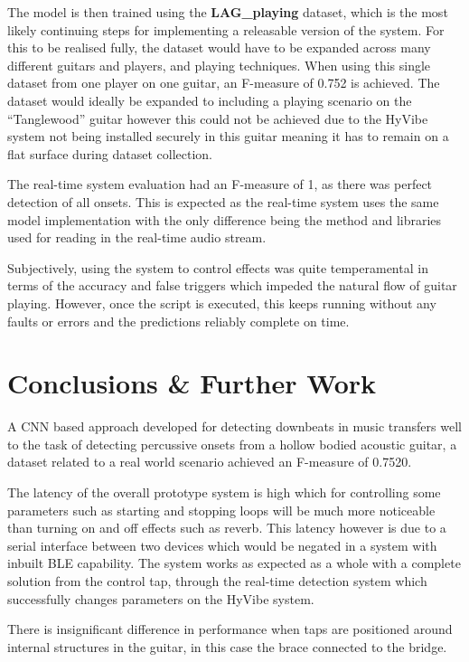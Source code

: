 \documentclass[conference]{IEEEtran}
\begin{document}
The model is then trained using the \textbf{LAG\_playing} dataset, which is the most likely continuing steps for implementing a releasable version of the system. For this to be realised fully, the dataset would have to be expanded across many different guitars and players, and playing techniques. When using this single dataset
from one player on one guitar, an F-measure of 0.752 is achieved. The dataset would ideally be expanded to including a playing scenario on the ``Tanglewood'' guitar however this could not be achieved due to the HyVibe system not being installed securely in this guitar meaning it has to remain on a flat
surface during dataset collection.

The real-time system evaluation had an F-measure of 1, as there was perfect detection of all onsets. This is expected as the real-time system uses the same model implementation with the only difference being the method and libraries used
for reading in the real-time audio stream. 

Subjectively, using the system to control effects was quite temperamental in terms of the accuracy and false triggers which impeded the natural flow of guitar playing. However, once the script is executed, this keeps running without any faults or errors and the predictions reliably complete on time.

\section{Conclusions \& Further Work}

A CNN based approach developed for detecting downbeats in music transfers well to the task of detecting percussive onsets from a hollow bodied acoustic guitar, a dataset related to a real world scenario achieved an F-measure of 0.7520.

The latency of the overall prototype system is high which for controlling some parameters such as starting and stopping loops will be much more noticeable than turning on and off effects such as reverb. This latency however is due to a serial interface between two devices which would be 
negated in a system with inbuilt BLE capability. The system works as expected as a whole with a complete solution from the control tap, through the real-time detection system which successfully changes parameters on the HyVibe system.

There is insignificant difference in performance when taps are positioned around internal structures in the guitar, in this case the brace connected to the bridge.
\end{document}
